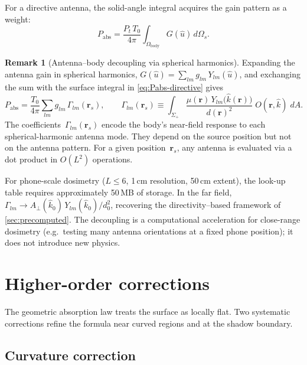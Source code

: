 \documentclass[11pt,a4paper]{article}
\theoremstyle{definition}      %
\newtheorem{remark}[remark]{Remark}
\newcommand{\rr}{\mathbf{r}}
\newcommand{\Aperp}{A_{\perp}}
\begin{document}
For a directive antenna, the solid-angle integral acquires the gain
pattern as a weight:
\begin{equation}\label{eq:Pabs-directive}
  P_{\mathrm{abs}}
  = \frac{P_t\,T_0}{4\pi}\int_{\Omega_{\mathrm{body}}}
    G(\hat{u})\,d\Omega_s.
\end{equation}

\begin{remark}[Antenna--body decoupling via spherical harmonics]
\label{rem:SH-NF}
Expanding the antenna gain in spherical harmonics,
$G(\hat{u})=\sum_{lm}g_{lm}\,Y_{lm}(\hat{u})$, and exchanging the
sum with the surface integral in \cref{eq:Pabs-directive} gives
\begin{equation}\label{eq:Gamma-lm}
  P_{\mathrm{abs}}
  = \frac{T_0}{4\pi}\sum_{lm}g_{lm}\,\Gamma_{lm}(\rr_s),
  \qquad
  \Gamma_{lm}(\rr_s)
  \equiv \int_{\Sigma_+}
    \frac{\mu(\rr)\,Y_{lm}\!\bigl(\hat{k}(\rr)\bigr)}{d(\rr)^2}
    \;O(\rr,\hat{k})\;dA.
\end{equation}
The coefficients~$\Gamma_{lm}(\rr_s)$ encode the body's near-field
response to each spherical-harmonic antenna mode.  They depend on the
source position but not on the antenna pattern.  For a given
position~$\rr_s$, any antenna is evaluated via a dot product in
$O(L^2)$ operations.

For phone-scale dosimetry ($L\le 6$, 1\,cm resolution, 50\,cm extent),
the look-up table requires approximately 50\,MB of storage.  In the
far field, $\Gamma_{lm}\to\Aperp(\hat{k}_0)\,Y_{lm}(\hat{k}_0)/d_0^2$,
recovering the directivity--based framework of
\cref{sec:precomputed}.  The decoupling is a computational
acceleration for close-range dosimetry (e.g.\ testing many antenna
orientations at a fixed phone position); it does not introduce new
physics.
\end{remark}


\section{Higher-order corrections}\label{sec:corrections}

The geometric absorption law treats the surface as locally flat.  Two
systematic corrections refine the formula near curved regions and at
the shadow boundary.

\subsection{Curvature correction}\label{sec:curvature}
\end{document}
